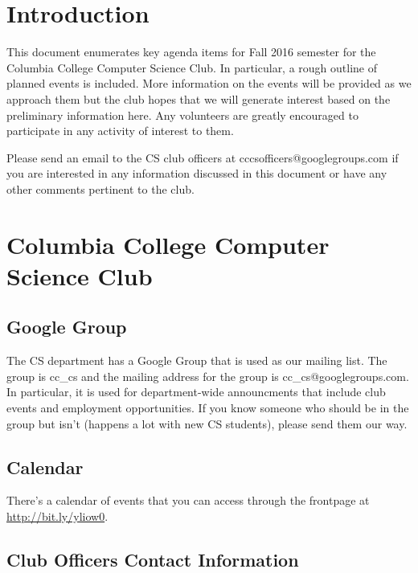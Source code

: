 

\renewcommand\TITLE{CCCS: Fall 2016 Agenda}


\topmatter


\section{Introduction}
\label{sec:orgheadline1}

This document enumerates key agenda items for Fall 2016 semester for the
Columbia College Computer Science Club. In particular, a rough outline of
planned events is included. More information on the events will be provided as
we approach them but the club hopes that we will generate interest based on the
preliminary information here. Any volunteers are greatly encouraged to
participate in any activity of interest to them.

Please send an email to the CS club officers at cccsofficers@googlegroups.com
if you are interested in any information discussed in this document or have any
other comments pertinent to the club.


\section{Columbia College Computer Science Club}
\label{sec:orgheadline8}

\subsection{Google Group}
\label{sec:orgheadline2}

The CS department has a Google Group that is used as our mailing list. The
group is cc\_cs and the mailing address for the group is cc\_cs@googlegroups.com.
In particular, it is used for department-wide announcments that include club
events and employment opportunities. If you know someone who should be in the
group but isn't (happens a lot with new CS students), please send them our way.

\subsection{Calendar}
\label{sec:orgheadline3}

There's a calendar of events that you can access through the frontpage at
\url{http://bit.ly/yliow0}.

\newpage

\subsection{Club Officers Contact Information}
\label{sec:orgheadline4}

